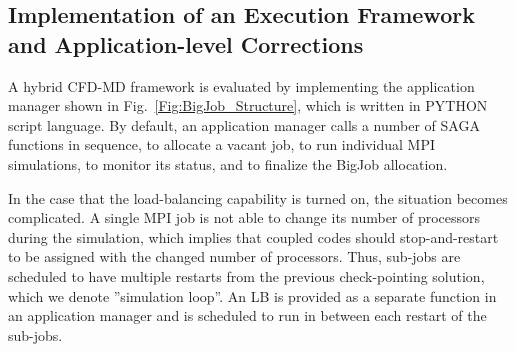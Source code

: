 \documentclass[preprint,12pt]{elsarticle}
\begin{document}



\subsection{Implementation of an Execution Framework and Application-level Corrections}
\label{sec:computational_hybridruntime}


A hybrid CFD-MD framework is evaluated by implementing the application manager shown in Fig.~\ref{Fig:BigJob_Structure}, which is written in PYTHON script language. By default, an application manager calls a number of SAGA functions in sequence, to allocate a vacant job, to run individual MPI simulations, to monitor its status, and to finalize the BigJob allocation.


In the case that the load-balancing capability is turned on, the situation becomes complicated. A single MPI job is not able to change its number of processors during the simulation, which implies that coupled codes should stop-and-restart to be assigned with the changed number of processors. Thus, sub-jobs are scheduled to have multiple restarts from the previous check-pointing solution, which we denote ''simulation loop''. An LB is provided as a separate function in an application manager and is scheduled to run in between each restart of the sub-jobs.
\end{document}
